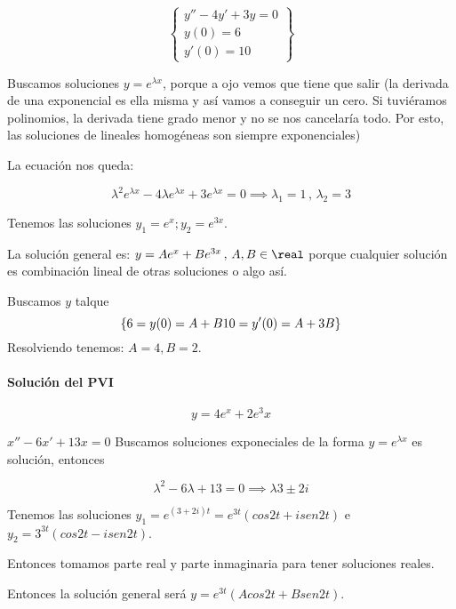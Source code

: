 \documentclass[nochap]{apuntes}
\begin{document}
\begin{problem}[4]
\[\left\{\begin{matrix}y''-4y'+3y=0\\y(0)=6\\y'(0)=10\end{matrix}\right\}\]

\solution

Buscamos soluciones $y=e^{\lambda x}$, porque a ojo vemos que tiene que salir (la derivada de una exponencial es ella misma y así vamos a conseguir un cero. Si tuviéramos polinomios, la derivada tiene grado menor y no se nos cancelaría todo. Por esto, las soluciones de lineales homogéneas son siempre exponenciales)

La ecuación nos queda:

\[\lambda^2e^{\lambda x} - 4\lambda e^{\lambda x} + 3e^{\lambda x} = 0 \implies \lambda_1 = 1\,,\,\lambda_2=3\]


Tenemos las soluciones $y_1 = e^x;y_2=e^{3x}$.

La solución general es:
$y= Ae^x+Be^{3x}\,,\, A,B\in\real$ porque cualquier solución es combinación lineal de otras soluciones o algo así.

Buscamos $y$ talque
\[\left\{
6=y(0) = A+B\\10=y'(0)=A+3B
\right\}\]
Resolviendo tenemos: $A=4,B=2$.

\paragraph{Solución del PVI}
\[y=4e^x+2e^3x\]

\end{problem}
\begin{problem}[4'5]
$x''-6x'+13x=0$
\solution
Buscamos soluciones exponeciales de la forma $y=e^{\lambda x}$ es solución, entonces 

\[\lambda^2 - 6\lambda + 13 = 0 \implies \lambda3\pm2i\]

Tenemos las soluciones $y_1 = e^{(3+2i)t} = e^{3t}(cos2t+isen2t)$ e $y_2=3^{3t}(cos2t - isen2t)$.

Entonces tomamos parte real y parte inmaginaria para tener soluciones reales.

Entonces la solución general será $y=e^{3t}(Acos2t + Bsen2t)$.
\end{problem}
\end{document}
